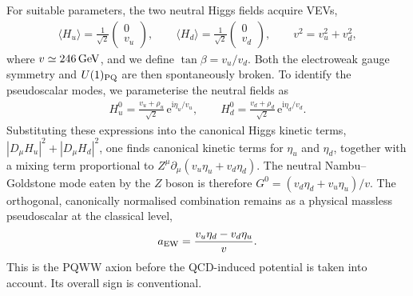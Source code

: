 \documentclass[review]{elsarticle}
\numberwithin{equation}{section}
\numberwithin{table}{section}
\numberwithin{figure}{section}
\def\i{\mathrm{i}}
\def\e{\mathrm{e}}
\begin{document}
For suitable parameters, the two neutral Higgs fields acquire VEVs,
\begin{align}
    \langle H_u\rangle = \frac{1}{\sqrt{2}}
    \begin{pmatrix}
        0\\ v_u
    \end{pmatrix},
    \qquad
    \langle H_d\rangle = \frac{1}{\sqrt{2}}
    \begin{pmatrix}
        0\\ v_d
    \end{pmatrix},
    \qquad
    v^2=v_u^2+v_d^2,
    \label{eq:PQWW-Higgs-vevs}
\end{align}
where $v\simeq246\,{\rm GeV}$, and we define $\tan\beta=v_u/v_d$. Both the electroweak gauge symmetry and $U(1)_{\rm PQ}$ are then spontaneously broken. To identify the pseudoscalar modes, we parameterise the neutral fields as
\begin{align}
    H_u^0 = \frac{v_u+\rho_u}{\sqrt{2}}\, \e^{\i\eta_u/v_u},
    \qquad
    H_d^0 = \frac{v_d+\rho_d}{\sqrt{2}}\, \e^{\i\eta_d/v_d}.
    \label{eq:PQWW-neutral-Higgs}
\end{align}
Substituting these expressions into the canonical Higgs kinetic terms, $|D_\mu H_u|^2+|D_\mu H_d|^2$, one finds canonical kinetic terms for $\eta_u$ and $\eta_d$, together with a mixing term proportional to
$Z^\mu\partial_\mu(v_u\eta_u+v_d\eta_d)$. The neutral Nambu--Goldstone mode eaten by the $Z$ boson is therefore
$G^0=(v_d\eta_d+v_u\eta_u)/v$. The orthogonal, canonically normalised combination remains as a physical massless pseudoscalar at the classical level, 
\begin{align}
    a_{\rm EW} = \frac{v_u\eta_d-v_d\eta_u}{v}.
    \label{eq:PQWW-axion-mode}
\end{align}
This is the PQWW axion before the QCD-induced potential is taken into account. Its overall sign is conventional.
\end{document}
